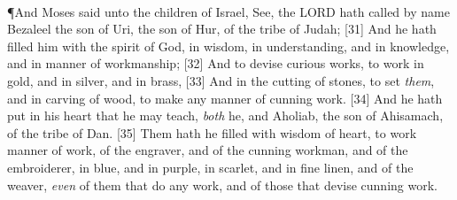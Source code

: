 \\
\P \textcolor[cmyk]{0.99998,1,0,0}{And Moses said unto the children of Israel, See, the LORD hath called by name Bezaleel the son of Uri, the son of Hur, of the tribe of Judah;}
[31] \textcolor[cmyk]{0.99998,1,0,0}{And he hath filled him with the spirit of God, in wisdom, in understanding, and in knowledge, and in   manner of workmanship;}
[32] \textcolor[cmyk]{0.99998,1,0,0}{And to devise curious works, to work in gold, and in silver, and in brass,}
[33] \textcolor[cmyk]{0.99998,1,0,0}{And in the cutting of stones, to set \emph{them}, and in carving of wood, to make any manner of cunning work.}
[34] \textcolor[cmyk]{0.99998,1,0,0}{And he hath put in his heart that he may teach, \emph{both} he, and Aholiab, the son of Ahisamach, of the tribe of Dan.}
[35] \textcolor[cmyk]{0.99998,1,0,0}{Them hath he filled with wisdom of heart, to work   manner of work, of the engraver, and of the cunning workman, and of the embroiderer, in blue, and in purple, in scarlet, and in fine linen, and of the weaver, \emph{even} of them that do any work, and of those that devise cunning work.}